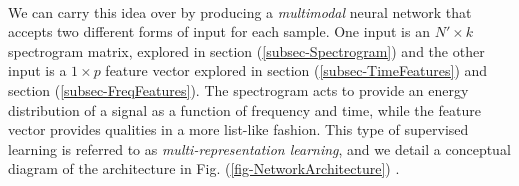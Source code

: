 \documentclass[12pt,letterpaper]{article}
\begin{document}
\paragraph*{}We can carry this idea over by producing a \textit{multimodal} neural network that accepts two different forms of input for each sample. One input is an $N' \times k$ spectrogram matrix, explored in section (\ref{subsec-Spectrogram}) and the other input is a $1 \times p$ feature vector explored in section (\ref{subsec-TimeFeatures}) and section (\ref{subsec-FreqFeatures}). The spectrogram acts to provide an energy distribution of a signal as a function of frequency and time, while the feature vector provides qualities in a more list-like fashion. This type of supervised learning is referred to as \textit{multi-representation learning}, and we detail a conceptual diagram of the architecture in Fig. (\ref{fig-NetworkArchitecture}) \cite{Li,Ngiam}.
\end{document}

